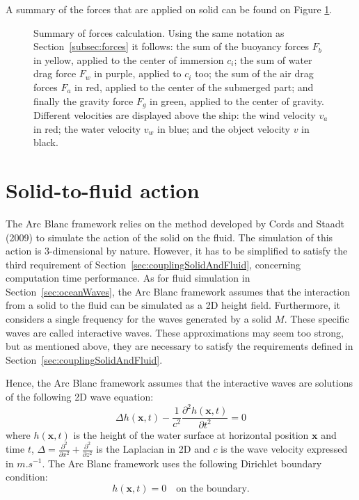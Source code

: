 \documentclass[final]{jcgt}
\def\Framework{The Arc Blanc framework\xspace}
\def\framework{the Arc Blanc framework\xspace}
\begin{document}
A summary of the forces that are applied on solid can be found on Figure \ref{fig:forcesComputation}.

\begin{figure}[!h]
	\centering
	
	\caption{Summary of forces calculation. Using the same notation as Section~\ref{subsec:forces} it follows:
		the sum of the buoyancy forces \textcolor{jauneC}{$F_b$} in \textcolor{jauneC}{yellow}, applied to the center of immersion $c_i$;
		the sum of water drag force \textcolor{purpleF}{$F_w$} in \textcolor{purpleF}{purple}, applied to $c_i$ too;
		the sum of the air drag forces \textcolor{redF}{$F_a$} in \textcolor{redF}{red}, applied to the center of the submerged part;
		and finally the gravity force \textcolor{greenF}{$F_g$} in \textcolor{greenF}{green}, applied to the center of gravity.
		Different velocities are displayed above the ship:
		the wind velocity \textcolor{redF}{$v_a$} in \textcolor{redF}{red};
		the water velocity \textcolor{bleuF}{$v_w$} in \textcolor{bleuF}{blue};
		and the object velocity \textcolor{noirC}{$v$} in \textcolor{noirC}{black}.}
	\label{fig:forcesComputation}
\end{figure}

\section{Solid-to-fluid action}
\label{sec:solidToFluidAction}
\Framework relies on the method developed by Cords and Staadt (2009) \cite{cordsRealTimeOpenWater2009} to simulate the action of the solid on the fluid.
The simulation of this action is 3-dimensional by nature.
However, it has to be simplified to satisfy the third requirement of Section~\ref{sec:couplingSolidAndFluid}, concerning computation time performance.
As for fluid simulation in Section~\ref{sec:oceanWaves}, \framework assumes that the interaction from a solid to the fluid can be simulated as a 2D height field.
Furthermore, it considers a single frequency for the waves generated by a solid $M$.
These specific waves are called interactive waves.
These approximations may seem too strong, but as mentioned above, they are necessary to satisfy the requirements defined in Section~\ref{sec:couplingSolidAndFluid}.

Hence, \framework assumes that the interactive waves are solutions of the following 2D wave equation:
\begin{equation}
	\label{eq:2dwave}
	\Delta h(\mathbf x,t)-\frac{1}{c^2}\frac{\partial^2 h(\mathbf x,t)}{\partial t^2}=0
\end{equation}
where $h(\mathbf x,t)$ is the height of the water surface at horizontal position $\mathbf x$ and time $t$, $\Delta=\frac{\partial^2}{\partial x^2}+\frac{\partial^2}{\partial z^2}$ is the Laplacian in 2D and $c$ is the wave velocity expressed in $m.s^{-1}$.
\Framework uses the following Dirichlet boundary condition:
\begin{equation}
	h(\mathbf x,t) = 0 \text{~~~on the boundary.}
\end{equation}
\end{document}
